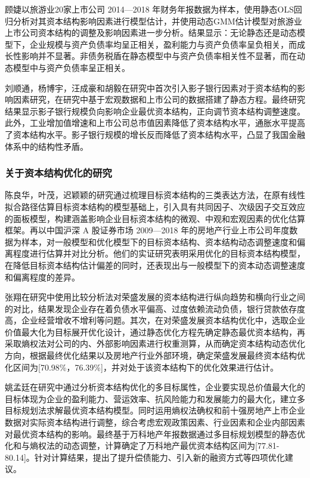 顾婕以旅游业20家上市公司 2014—2018 年财务年报数据为样本，使用静态OLS回归分析对其资本结构影响因素进行模型估计，并使用动态GMM估计模型对旅游业上市公司资本结构的调整及影响因素进一步分析。结果显示：无论静态还是动态模型下，企业规模与资产负债率均呈正相关，盈利能力与资产负债率呈负相关，而成长性影响并不显著。非债务税盾在静态模型中与资产负债率相关性不显著，而在动态模型中与资产负债率呈正相关。\cite{Gu2022}

刘顺通，杨博宇，汪成豪和胡毅在研究中首次引入影子银行因素对于资本结构的影响因素研究，在研究中基于宏观数据和上市公司的数据搭建了静态方程。最终研究结果显示影子银行规模负向影响企业最优资本结构，正向调节资本结构调整速度。此外，工业增加值增速和上市公司总市值因素降低了资本结构水平，通胀水平提高了资本结构水平。影子银行规模的增长反而降低了资本结构水平，凸显了我国金融体系中的结构性矛盾。\cite{liu2023}
\subsubsection{关于资本结构优化的研究}
陈良华，叶茂，迟颖颖的研究通过梳理目标资本结构的三类表达方法，在原有线性拟合路径估算目标资本结构的模型基础上，引入具有共同因子、次级因子交互效应的面板模型，构建涵盖影响企业目标资本结构的微观、中观和宏观因素的优化估算框架。再以中国沪深 A 股证券市场 2009—2018 年的房地产行业上市公司年度数据为样本，对一般模型和优化模型下的目标资本结构、资本结构动态调整速度和偏离程度进行估算并对比分析。他们的实证研究表明采用优化的目标资本结构模型，在降低目标资本结构估计偏差的同时，还表现出与一般模型下的资本动态调整速度和偏离程度的差异。\cite{Chen2022}

张翔在研究中使用比较分析法对荣盛发展的资本结构进行纵向趋势和横向行业之间的对比，结果发现企业存在着负债水平偏高、过度依赖流动负债，银行贷款依存度高，企业经营增收不增利等问题。其次，在对荣盛发展资本结构优化中，选取企业价值最大化为目标展开优化设计，通过静态优化方程先确定静态最优资本结构，再采取熵权法对公司的内、外部影响因素进行权重测算，从而确定资本结构动态优化方向，根据最终优化结果以及房地产行业外部环境，确定荣盛发展最终资本结构优化区间为[70.98\%，76.39\%]，并对处于该资本结构下的优化效果进行估计。\cite{Zhang2022a}

姚孟廷在研究中通过分析资本结构优化的多目标属性，企业要实现总价值最大化的目标体现为企业的盈利能力、营运效率、抗风险能力和发展能力的最大化，建立多目标规划法求解最优资本结构模型。同时运用熵权法确权和前十强房地产上市企业数据对实际资本结构进行调整，综合考虑宏观政策因素、行业因素和企业内部因素对最优资本结构的影响。最终基于万科地产年报数据通过多目标规划模型的静态优化和与熵权法的动态调整，计算确定了万科地产最优资本结构区间为[77.81-80.14]。针对计算结果，提出了提升偿债能力、引入新的融资方式等四项优化建议。\cite{Yao2022}

